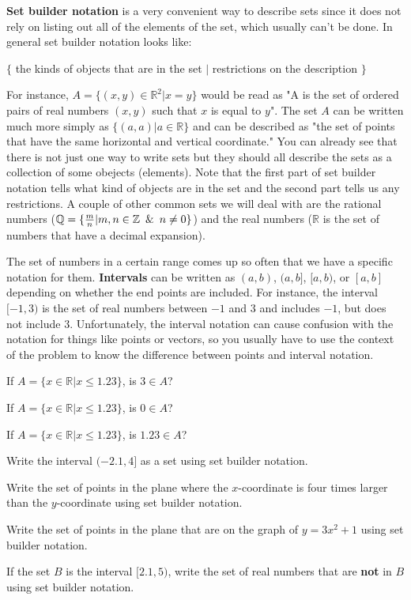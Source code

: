 \begin{info}
\textbf{Set builder notation} is a very convenient way to describe sets since it does not rely on listing out all of the elements of the set, which usually can't be done. In general set builder notation looks like:

$\{ $ the kinds of objects that are in the set $|$ restrictions on the description $\}$

For instance, $A=\{ (x,y) \in \mathbb{R}^2 | x=y\}$ would be read as "A is the set of ordered pairs of real numbers $(x,y)$ such that $x$ is equal to $y$". The set $A$ can be written much more simply as $\{(a,a)|a \in \mathbb{R} \}$ and can be described as "the set of points that have the same horizontal and vertical coordinate." You can already see that there is not just one way to write sets but they should all describe the sets as a collection of some obejects (elements).  Note that the first part of set builder notation tells what kind of objects are in the set and the second part tells us any restrictions.
A couple of other common sets we will deal with are the rational numbers ($\mathbb{Q}=\{ \frac{m}{n} | m,n \in \mathbb{Z} \enskip \& \enskip  n \neq 0 \}$) and the real numbers ($\mathbb{R}$ is the set of numbers that have a decimal expansion).

The set of numbers in a certain range comes up so often that we have a specific notation for them. \textbf{Intervals} can be written as $(a,b)$, $(a,b]$, $[a,b)$, or $[a,b]$ depending on whether the end points are included. For instance, the interval $[-1,3)$ is the set of real numbers between $-1$ and $3$ and includes $-1$, but does not include $3$. Unfortunately, the interval notation can cause confusion with the notation for things like points or vectors, so you usually have to use the context of the problem to know the difference between points and interval notation.

\end{info}

\bq\label{s1}
\be
\item If $A=\{ x \in \mathbb{R} | x \leq 1.23\}$, is $3 \in A$?
\item If $A=\{ x \in \mathbb{R} | x \leq 1.23\}$, is $0 \in A$?
\item If $A=\{ x \in \mathbb{R} | x \leq 1.23\}$, is $1.23 \in A$?
\item Write the interval $(-2.1,4]$ as a set using set builder notation.
\item Write the set of points in the plane where the $x$-coordinate is four times larger than the $y$-coordinate using set builder notation.
\item Write the set of points in the plane that are on the graph of $y=3x^2+1$ using set builder notation.
\item If the set $B$ is the interval $[2.1,5)$, write the set of real numbers that are \textbf{not} in $B$ using set builder notation.
\ee
\eq

